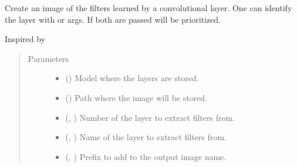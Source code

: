 \documentclass[letterpaper,10pt,english]{sphinxmanual}
\begin{document}

\begin{fulllineitems}
\label{\detokenize{utils/util:utils.util.save_filters_of_convlayer}}
Create an image of the filters learned by a convolutional layer. One can identify the layer with  or
 args. If both are passed  will be prioritized.

Inspired by 
\begin{quote}\begin{description}
\item[{Parameters}] \leavevmode\begin{itemize}
\item {} 
 () \textendash{} Model where the layers are stored.

\item {} 
 () \textendash{} Path where the image will be stored.

\item {} 
 (, ) \textendash{} Number of the layer to extract filters from.

\item {} 
 (, ) \textendash{} Name of the layer to extract filters from.

\item {} 
 (, ) \textendash{} Prefix to add to the output image name.


\end{itemize}
\end{description}
\end{quote}
\end{fulllineitems}
\end{document}
